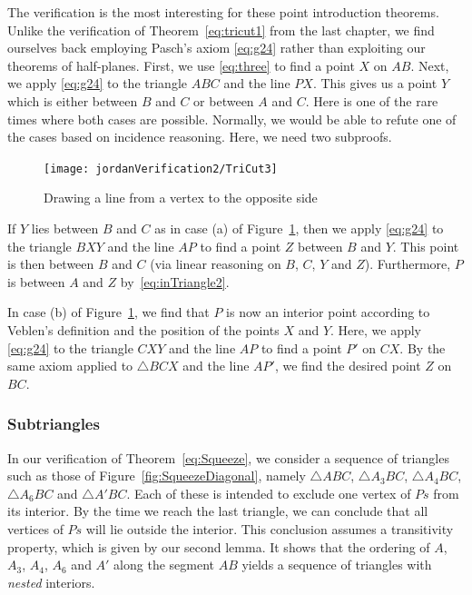 The verification is the most interesting for these point introduction theorems. Unlike the verification of Theorem~\ref{eq:tricut1} from the last chapter, we find ourselves back employing Pasch's axiom \eqref{eq:g24} rather than exploiting our theorems of half-planes. First, we use \ref{eq:three} to find a point $X$ on $AB$. Next, we apply \eqref{eq:g24} to the triangle $ABC$ and the line $PX$. This gives us a point $Y$ which is either between $B$ and $C$ or between $A$ and $C$. Here is one of the rare times where both cases are possible. Normally, we would be able to refute one of the cases based on incidence reasoning. Here, we need two subproofs.

\begin{figure}
\centering\texttt{[image: jordanVerification2/TriCut3]}
\caption{Drawing a line from a vertex to the opposite side}
\label{fig:TriCut3}
\end{figure}

If $Y$ lies between $B$ and $C$ as in case (a) of Figure~\ref{fig:TriCut3}, then we apply \eqref{eq:g24} to the triangle $BXY$ and the line $AP$ to find a point $Z$ between $B$ and $Y$. This point is then between $B$ and $C$ (via linear reasoning on $B$, $C$, $Y$ and $Z$). Furthermore, $P$ is between $A$ and $Z$ by~\eqref{eq:inTriangle2}.

In case (b) of Figure~\ref{fig:TriCut3}, we find that $P$ is now an interior point according to Veblen's definition and the position of the points $X$ and $Y$. Here, we apply \eqref{eq:g24} to the triangle $CXY$ and the line $AP$ to find a point $P'$ on $CX$. By the same axiom applied to $\triangle BCX$ and the line $AP'$, we find the desired point $Z$ on $BC$.

\subsubsection{Subtriangles}\label{sec:Subtriangles}
In our verification of Theorem~\ref{eq:Squeeze}, we consider a sequence of triangles such as those of Figure~\ref{fig:SqueezeDiagonal}, namely $\triangle ABC$, $\triangle A_3BC$, $\triangle A_4BC$, $\triangle A_6BC$ and $\triangle A'BC$. Each of these is intended to exclude one vertex of $Ps$ from its interior. By the time we reach the last triangle, we can conclude that all vertices of $Ps$ will lie outside the interior. This conclusion assumes a transitivity property, which is given by our second lemma. It shows that the ordering of $A$, $A_3$, $A_4$, $A_6$ and $A'$ along the segment $AB$ yields a sequence of triangles with \emph{nested} interiors. 

